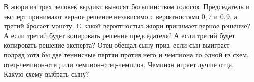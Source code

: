 \documentclass[a4paper,11pt]{article}
\begin{document}
%
%















%
%

%

%
 В жюри из трех человек вердикт %
выносят большинством голосов. Председатель и эксперт принимают
верное решение независимо с вероятностями $0{,}7$ и $0{,}9$,
а третий бросает монету. С~какой вероятностью жюри принимает верное решение?
 А если третий будет копировать решение председателя?
 А если третий будет копировать решение эксперта?
%
Отец обещал сыну приз, если сын выиграет подряд хотя бы две теннисные
партии против него и чемпиона по одной из схем:
отец-чемпион-отец или чемпион-отец-чемпион.
Чемпион играет лучше отца. Какую схему выбрать сыну?
%
\end{document}
